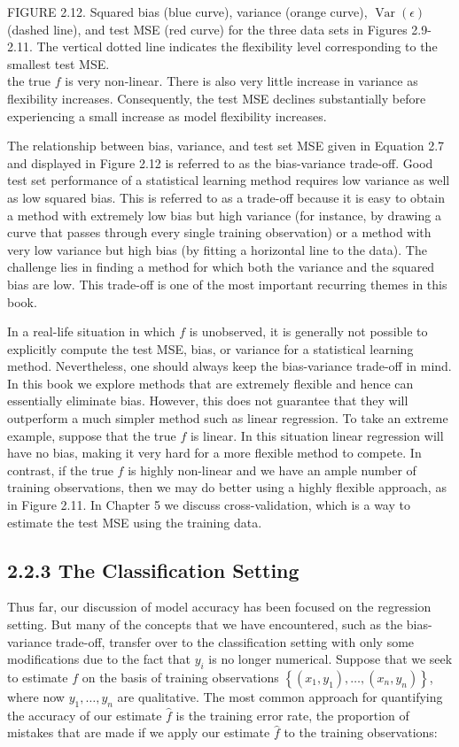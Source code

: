 \documentclass[10pt]{article}
\begin{document}
FIGURE 2.12. Squared bias (blue curve), variance (orange curve), $\operatorname{Var}(\epsilon)$ (dashed line), and test MSE (red curve) for the three data sets in Figures 2.9-2.11. The vertical dotted line indicates the flexibility level corresponding to the smallest test MSE.\\
the true $f$ is very non-linear. There is also very little increase in variance as flexibility increases. Consequently, the test MSE declines substantially before experiencing a small increase as model flexibility increases.

The relationship between bias, variance, and test set MSE given in Equation 2.7 and displayed in Figure 2.12 is referred to as the bias-variance trade-off. Good test set performance of a statistical learning method requires low variance as well as low squared bias. This is referred to as a trade-off because it is easy to obtain a method with extremely low bias but high variance (for instance, by drawing a curve that passes through every single training observation) or a method with very low variance but high bias (by fitting a horizontal line to the data). The challenge lies in finding a method for which both the variance and the squared bias are low. This trade-off is one of the most important recurring themes in this book.

In a real-life situation in which $f$ is unobserved, it is generally not possible to explicitly compute the test MSE, bias, or variance for a statistical learning method. Nevertheless, one should always keep the bias-variance trade-off in mind. In this book we explore methods that are extremely flexible and hence can essentially eliminate bias. However, this does not guarantee that they will outperform a much simpler method such as linear regression. To take an extreme example, suppose that the true $f$ is linear. In this situation linear regression will have no bias, making it very hard for a more flexible method to compete. In contrast, if the true $f$ is highly non-linear and we have an ample number of training observations, then we may do better using a highly flexible approach, as in Figure 2.11. In Chapter 5 we discuss cross-validation, which is a way to estimate the test MSE using the training data.

\subsection*{2.2.3 The Classification Setting}
Thus far, our discussion of model accuracy has been focused on the regression setting. But many of the concepts that we have encountered, such as the bias-variance trade-off, transfer over to the classification setting with only some modifications due to the fact that $y_{i}$ is no longer numerical. Suppose that we seek to estimate $f$ on the basis of training observations $\left\{\left(x_{1}, y_{1}\right), \ldots,\left(x_{n}, y_{n}\right)\right\}$, where now $y_{1}, \ldots, y_{n}$ are qualitative. The most common approach for quantifying the accuracy of our estimate $\hat{f}$ is the training error rate, the proportion of mistakes that are made if we apply our estimate $\hat{f}$ to the training observations:
\end{document}
